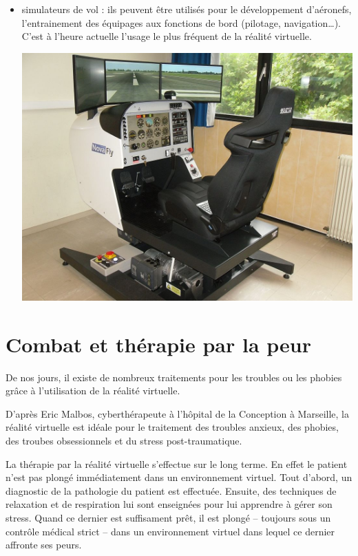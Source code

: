 \documentclass[12pt, a4paper]{report}
\begin{document}
\begin{itemize}
\item simulateurs de vol : ils peuvent être utilisés pour le développement d'aéronefs, l'entrainement des équipages aux fonctions de bord (pilotage, navigation\ldots{}). C'est à l'heure actuelle l'usage le plus fréquent de la réalité virtuelle.

\begin{center}
\includegraphics[scale=0.25]{conduite.jpg}
\end{center}
\end{itemize}
\section[Peur et réalité virtuelle]{Combat et thérapie par la peur}

De nos jours, il existe de nombreux traitements pour les troubles ou les phobies grâce à l'utilisation de la réalité virtuelle.

D'après Eric Malbos, cyberthérapeute à l'hôpital de la Conception à Marseille, la réalité virtuelle est idéale pour le traitement des troubles anxieux, des phobies, des troubes obsessionnels et du stress post-traumatique.

La thérapie par la réalité virtuelle s'effectue sur le long terme. En effet le patient n'est pas plongé immédiatement dans un environnement virtuel. Tout d'abord, un diagnostic de la pathologie du patient est effectuée. Ensuite, des techniques de relaxation et de respiration lui sont enseignées pour lui apprendre à gérer son stress. Quand ce dernier est suffisament prêt, il est plongé -- toujours sous un contrôle médical strict -- dans un environnement virtuel dans lequel ce dernier affronte ses peurs.
\end{document}
